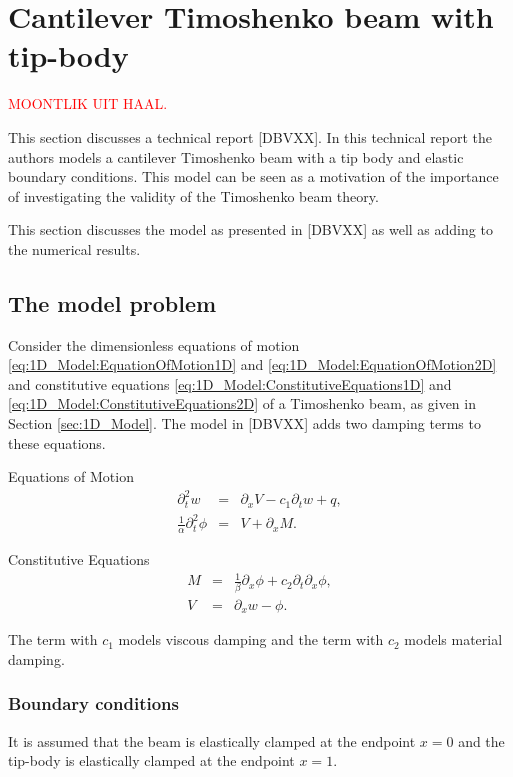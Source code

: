 \documentclass[../../main.tex]{subfiles}
\begin{document}
\noindent
\section{Cantilever Timoshenko beam with tip-body}

\textcolor{red}{MOONTLIK UIT HAAL.}

This section discusses a technical report [DBVXX]. In this technical report the authors models a cantilever Timoshenko beam with a tip body and elastic boundary conditions. This model can be seen as a motivation of the importance of investigating the validity of the Timoshenko beam theory.

This section discusses the model as presented in [DBVXX] as well as adding to the numerical results.

\subsection{The model problem}
Consider the dimensionless equations of motion \ref{eq:1D_Model:EquationOfMotion1D} and \ref{eq:1D_Model:EquationOfMotion2D} and constitutive equations \ref{eq:1D_Model:ConstitutiveEquations1D} and \ref{eq:1D_Model:ConstitutiveEquations2D} of a Timoshenko beam, as given in Section \ref{sec:1D_Model}. The model in [DBVXX] adds two damping terms to these equations.


{Equations of Motion}
\begin{eqnarray}
	\partial_t^2 w &=& \partial_x V - c_1\partial_t w  + q, \label{CT_1}\\
	\frac{1}{\alpha}\partial_t^2 \phi &=& V+\partial_xM. \label{CT_2}
\end{eqnarray}

\noindent
{Constitutive Equations}
\begin{eqnarray}
	M &=& \frac{1}{\beta}\partial_x \phi +c_2 \partial_t \partial_x \phi,\label{CT_3}\\
	V&=& \partial_x w - \phi.\label{CT_4}
\end{eqnarray}

The term with $c_1$ models viscous damping and the term with $c_2$ models material damping.

\subsubsection{Boundary conditions}
It is assumed that the beam is elastically clamped at the endpoint $x=0$ and the tip-body is elastically clamped at the endpoint $x=1$.\\
\end{document}
